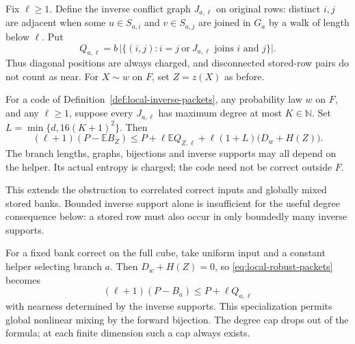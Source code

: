 Fix $\ell\ge1$. Define the inverse conflict graph $J_{a,\ell}$ on original
rows: distinct $i,j$ are adjacent when some $u\in S_{a,i}$ and
$v\in S_{a,j}$ are joined in $G_a$ by a walk of length below $\ell$.
Put
\[
 Q_{a,\ell}=b\,\bigl|\{(i,j):i=j\ \text{or}\
                 J_{a,\ell}\text{ joins }i\text{ and }j\}\bigr|.
\]
Thus diagonal positions are always charged, and disconnected stored-row
pairs do not count as near. For $X\sim w$ on $F$, set $Z=z(X)$ as before.

\begin{theorem}\label{thm:local-robust-packets}
For a code of Definition~\ref{def:local-inverse-packets}, any probability law
$w$ on $F$, and any $\ell\ge1$, suppose every $J_{a,\ell}$ has maximum
degree at most $K\in\mathbb N$. Set $L=\min\{d,16(K+1)^2\}$. Then
\begin{equation}\label{eq:local-robust-packets}
 (\ell+1)(P-\mathbb E B_Z)
 \le P+\ell\mathbb E Q_{Z,\ell}+\ell(1+L)\bigl(D_w+H(Z)\bigr).
\end{equation}
The branch lengths, graphs, bijections and inverse supports may all depend
on the helper. Its actual entropy is charged; the code need not be correct
outside $F$.
\end{theorem}

This extends the obstruction to correlated correct inputs and globally mixed
stored banks. Bounded inverse support alone is insufficient for the useful
degree consequence below: a stored row must also occur in only boundedly
many inverse supports.

For a fixed bank correct on the full cube, take uniform input and a constant
helper selecting branch $a$. Then $D_w+H(Z)=0$, so
\eqref{eq:local-robust-packets} becomes
\[
  (\ell+1)(P-B_a)\le P+\ell Q_{a,\ell}
\]
with nearness determined by the inverse supports. This specialization permits
global nonlinear mixing by the forward bijection. The degree cap drops out
of the formula; at each finite dimension such a cap always exists.

